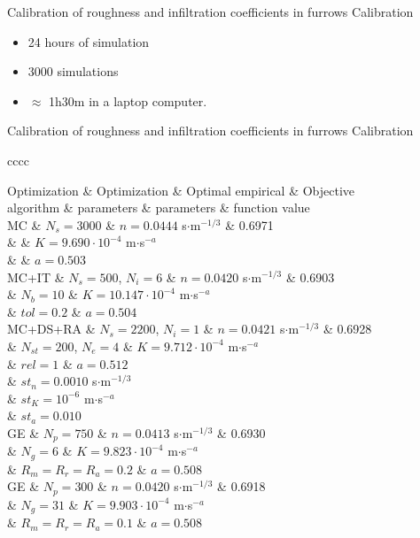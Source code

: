 \documentclass[10pt]{beamer}
\newcommand{\TABLE}[3]
{
	\begin{table}[ht!]
		\centering
		#1
		\tabulinesep=0.9mm
		\begin{tabu}{#2}
			#3
		\end{tabu}
	\end{table}
}
\begin{document}
\begin{frame}{Calibration of roughness and infiltration coefficients in furrows}
{Calibration}
	\begin{itemize}
		\item 24 hours of simulation
		\item 3000 simulations
		\item $\approx$ 1h30m in a laptop computer.
	\end{itemize}
\end{frame}

\begin{frame}{Calibration of roughness and infiltration coefficients in furrows}
{Calibration}
\TABLE{\tiny}{cccc}
{
	Optimization & Optimization & Optimal empirical & Objective
	\\ algorithm & parameters & parameters & function value
	\\ \hline
	MC & $N_s=3000$ & $n=0.0444$ s$\cdot$m$^{-1/3}$ & 0.6971
	\\ & & $K=9.690\cdot 10^{-4}$ m$\cdot$s$^{-a}$
	\\ & & $a=0.503$
	\\ \hline
	MC+IT & $N_s=500$, $N_i=6$ & $n=0.0420$ s$\cdot$m$^{-1/3}$ & 0.6903
	\\ & $N_b=10$ & $K=10.147\cdot 10^{-4}$ m$\cdot$s$^{-a}$
	\\ & $tol=0.2$ & $a=0.504$
	\\ \hline
	MC+DS+RA & $N_s=2200$, $N_i=1$ & $n=0.0421$ s$\cdot$m$^{-1/3}$ & 0.6928
	\\ & $N_{st}=200$, $N_e=4$ & $K=9.712\cdot 10^{-4}$ m$\cdot$s$^{-a}$
	\\ & $rel=1$ & $a=0.512$
	\\ & $st_n=0.0010$ s$\cdot$m$^{-1/3}$
	\\ & $st_K=10^{-6}$ m$\cdot$s$^{-a}$
	\\ & $st_a=0.010$
	\\ \hline
	GE & $N_p=750$ & $n=0.0413$ s$\cdot$m$^{-1/3}$  & 0.6930
	\\ & $N_g=6$ & $K=9.823\cdot 10^{-4}$ m$\cdot$s$^{-a}$
	\\ & $R_m=R_r=R_a=0.2$ & $a=0.508$
	\\ \hline
	GE & $N_p=300$ & $n=0.0420$ s$\cdot$m$^{-1/3}$  & 0.6918
	\\ & $N_g=31$ & $K=9.903\cdot 10^{-4}$ m$\cdot$s$^{-a}$
	\\ & $R_m=R_r=R_a=0.1$ & $a=0.508$
	\\ \hline
}
\end{frame}
\end{document}
